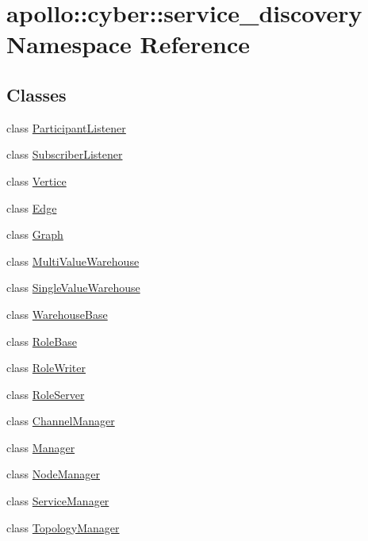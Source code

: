 \hypertarget{namespaceapollo_1_1cyber_1_1service__discovery}{\section{apollo\-:\-:cyber\-:\-:service\-\_\-discovery Namespace Reference}
\label{namespaceapollo_1_1cyber_1_1service__discovery}
}
\subsection*{Classes}
\begin{DoxyCompactItemize}
\item 
class \hyperlink{classapollo_1_1cyber_1_1service__discovery_1_1ParticipantListener}{Participant\-Listener}
\item 
class \hyperlink{classapollo_1_1cyber_1_1service__discovery_1_1SubscriberListener}{Subscriber\-Listener}
\item 
class \hyperlink{classapollo_1_1cyber_1_1service__discovery_1_1Vertice}{Vertice}
\item 
class \hyperlink{classapollo_1_1cyber_1_1service__discovery_1_1Edge}{Edge}
\item 
class \hyperlink{classapollo_1_1cyber_1_1service__discovery_1_1Graph}{Graph}
\item 
class \hyperlink{classapollo_1_1cyber_1_1service__discovery_1_1MultiValueWarehouse}{Multi\-Value\-Warehouse}
\item 
class \hyperlink{classapollo_1_1cyber_1_1service__discovery_1_1SingleValueWarehouse}{Single\-Value\-Warehouse}
\item 
class \hyperlink{classapollo_1_1cyber_1_1service__discovery_1_1WarehouseBase}{Warehouse\-Base}
\item 
class \hyperlink{classapollo_1_1cyber_1_1service__discovery_1_1RoleBase}{Role\-Base}
\item 
class \hyperlink{classapollo_1_1cyber_1_1service__discovery_1_1RoleWriter}{Role\-Writer}
\item 
class \hyperlink{classapollo_1_1cyber_1_1service__discovery_1_1RoleServer}{Role\-Server}
\item 
class \hyperlink{classapollo_1_1cyber_1_1service__discovery_1_1ChannelManager}{Channel\-Manager}
\item 
class \hyperlink{classapollo_1_1cyber_1_1service__discovery_1_1Manager}{Manager}
\item 
class \hyperlink{classapollo_1_1cyber_1_1service__discovery_1_1NodeManager}{Node\-Manager}
\item 
class \hyperlink{classapollo_1_1cyber_1_1service__discovery_1_1ServiceManager}{Service\-Manager}
\item 
class \hyperlink{classapollo_1_1cyber_1_1service__discovery_1_1TopologyManager}{Topology\-Manager}
\end{DoxyCompactItemize}
